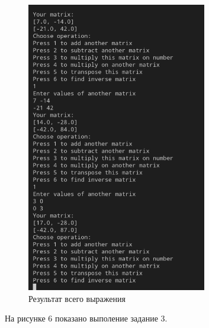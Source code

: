 \documentclass[bachelor, och, labwork]{shiza}
\begin{document}
        \begin{figure}[H]
            \centering
            \includegraphics[width=0.7\textwidth]{photo/5.png}
            \caption{Результат всего выражения}
        \end{figure} 

        На рисунке 6 показано выполение задание 3.
\end{document}
